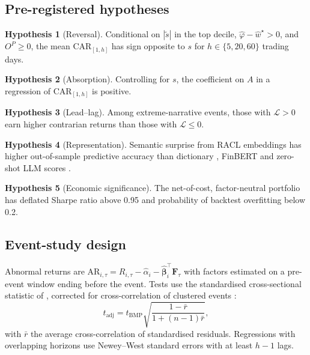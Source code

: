 \documentclass[11pt,a4paper]{article}
\theoremstyle{plain}
\theoremstyle{definition}
\newtheorem{hypothesis}{Hypothesis}
\theoremstyle{remark}
\begin{document}
\subsection{Pre-registered hypotheses}
\begin{hypothesis}[Reversal]\label{hyp:reversal}
Conditional on $|\tilde s|$ in the top decile, $\hat\varphi-\hat w^\star>0$, and $O^P\ge0$, the mean $\mathrm{CAR}_{[1,h]}$ has sign opposite to $s$ for $h\in\{5,20,60\}$ trading days.
\end{hypothesis}
\begin{hypothesis}[Absorption]\label{hyp:absorption}
Controlling for $s$, the coefficient on $A$ in a regression of $\mathrm{CAR}_{[1,h]}$ is positive.
\end{hypothesis}
\begin{hypothesis}[Lead--lag]\label{hyp:leadlag}
Among extreme-narrative events, those with $\mathcal{L}>0$ earn higher contrarian returns than those with $\mathcal{L}\le0$.
\end{hypothesis}
\begin{hypothesis}[Representation]\label{hyp:representation}
Semantic surprise from RACL embeddings has higher out-of-sample predictive accuracy than dictionary \citep{loughran2011}, FinBERT \citep{araci2019} and zero-shot LLM scores \citep{lopezlira2023}.
\end{hypothesis}
\begin{hypothesis}[Economic significance]\label{hyp:economic}
The net-of-cost, factor-neutral portfolio has deflated Sharpe ratio above 0.95 and probability of backtest overfitting below 0.2.
\end{hypothesis}

\subsection{Event-study design}
Abnormal returns are $\mathrm{AR}_{i,\tau}=R_{i,\tau}-\hat\alpha_i-\hat{\bm\beta}_i^\top\bm F_\tau$ with factors estimated on a pre-event window ending before the event. Tests use the standardised cross-sectional statistic of \citet{boehmer1991}, corrected for cross-correlation of clustered events \citep{kolari2010}:
\begin{equation}
  t_{\mathrm{adj}}=t_{\mathrm{BMP}}\sqrt{\frac{1-\bar r}{1+(n-1)\bar r}},
\end{equation}
with $\bar r$ the average cross-correlation of standardised residuals. Regressions with overlapping horizons use Newey--West standard errors \citep{newey1987} with at least $h-1$ lags.
\end{document}
